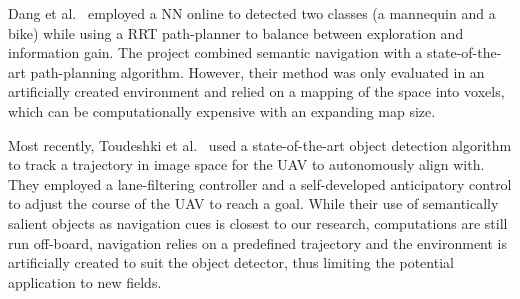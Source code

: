 \documentclass[a4paper,12pt]{article}
\theoremstyle{mytheor}
\begin{document}
Dang et al.~\cite{dang_autonomous_2018} employed a NN online to detected two classes (a mannequin and a bike) while using a RRT path-planner to balance between exploration and information gain. The project combined semantic navigation with a state-of-the-art path-planning algorithm. However, their method was only evaluated in an artificially created environment and relied on a mapping of the space into voxels, which can be computationally expensive with an expanding map size.

Most recently, Toudeshki et al.~\cite{toudeshki_robust_2018} used a state-of-the-art object detection algorithm to track a trajectory in image space for the UAV to autonomously align with. They employed a lane-filtering controller and a self-developed anticipatory control to adjust the course of the UAV to reach a goal. While their use of semantically salient objects as navigation cues is closest to our research, computations are still run off-board, navigation relies on a predefined trajectory and the environment is artificially created to suit the object detector, thus limiting the potential application to new fields.



\end{document}
